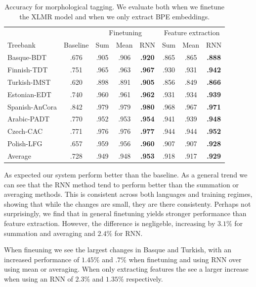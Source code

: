 \documentclass[11pt]{article}
\begin{document}
	\begin{table}[h]
	\centering
	\begin{tabular}{l|c|ccc|ccc}
		& & \multicolumn{3}{c}{Finetuning} & \multicolumn{3}{c}{Feature extraction} \\
		Treebank & Baseline & Sum & Mean & RNN & Sum & Mean & RNN \\
		\hline
        Basque-BDT      & .676 & .905 & .906 & \textbf{.920} & .865 & .865 & \textbf{.888} \\
		Finnish-TDT     & .751 & .965 & .963 & \textbf{.967} & .930 & .931 & \textbf{.942} \\ 
		Turkish-IMST    & .620 & .898 & .891 & \textbf{.905} & .856 & .849 & \textbf{.866}\\
		Estonian-EDT    & .740 & .960 & .961 & \textbf{.962} & .931 & .934 & \textbf{.939} \\
		Spanish-AnCora  & .842 & .979 & .979 & \textbf{.980} & .968 & .967 & \textbf{.971} \\
		Arabic-PADT     & .770 & .952 & .953 & \textbf{.954} & .941 & .939 & \textbf{.948} \\
		Czech-CAC       & .771 & .976 & .976 & \textbf{.977} & .944 & .944 & \textbf{.952} \\
		Polish-LFG      & .657 & .959 & .956 & \textbf{.960} & .907 & .907 & \textbf{.928} \\
        \hline
        Average         & .728 & .949 & .948 & \textbf{.953} & .918 & .917 & \textbf{.929} \\
	\end{tabular}
	\caption{\label{tab:results_tokens} Accuracy for morphological tagging. We evaluate both when we finetune the XLMR model and when we only extract BPE embeddings.}
	\end{table}

        As expected our system perform better than the baseline. As a
     general trend we can see that the RNN method tend to perform
     better than the summation or averaging methods. This is
     consistent across both languages and training regimes, showing
     that while the changes are small, they are there consistenty.
        Perhaps not surprisingly, we find that in general finetuning
     yields stronger performance than feature extraction. However, the
     difference is negligeble, increasing by $3.1\%$ for summation and
     averaging and $2.4\%$ for RNN.

            When fineuning we see the largest changes in Basque and
     Turkish, with an increased performance of $1.45\%$ and $.7\%$
     when finetuning and using RNN over using mean or averaging. When
     only extracting features the see a larger increase when using an
     RNN of $2.3\%$ and $1.35\%$ respectively.
\end{document}
